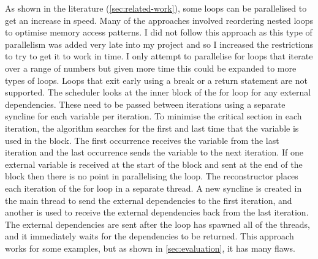 As shown in the literature (\autoref{sec:related-work}), some loops can be parallelised to get an increase in speed. Many of the approaches involved reordering nested loops to optimise memory access patterns. I did not follow this approach as this type of parallelism was added very late into my project and so I increased the restrictions to try to get it to work in time. I only attempt to parallelise for loops that iterate over a range of numbers but given more time this could be expanded to more types of loops. Loops that exit early using a break or a return statement are not supported. The scheduler looks at the inner block of the for loop for any external dependencies. These need to be passed between iterations using a separate syncline for each variable per iteration. To minimise the critical section in each iteration, the algorithm searches for the first and last time that the variable is used in the block. The first occurrence receives the variable from the last iteration and the last occurrence sends the variable to the next iteration. If one external variable is received at the start of the block and sent at the end of the block then there is no point in parallelising the loop. The reconstructor places each iteration of the for loop in a separate thread. A new syncline is created in the main thread to send the external dependencies to the first iteration, and another is used to receive the external dependencies back from the last iteration. The external dependencies are sent after the loop has spawned all of the threads, and it immediately waits for the dependencies to be returned. This approach works for some examples, but as shown in \autoref{sec:evaluation}, it has many flaws.

\begin{comment}
\begin{code}
\begin{verbatim}
let a; // Local without init
a = {
    let b = vec![1,2,3]; // Local with init
    println!("{:?}", b); // Mac
    b.len() // Expr
}; // Semi
\end{verbatim}
\caption{Example showing different StmtKinds}
\end{code}
\end{comment}

